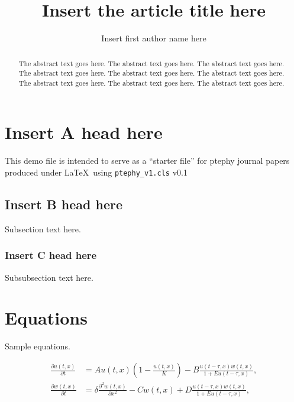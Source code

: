 \documentclass[preprint]{ptephy_v1}%
\begin{document}
\title{Insert the article title here}


\author{Insert first author name here}



\begin{abstract}%
The abstract text goes here. The abstract text goes here. The abstract text goes here.
The abstract text goes here. The abstract text goes here. The abstract text goes here.
The abstract text goes here. The abstract text goes here. The abstract text goes here.
\end{abstract}


\maketitle


\section{Insert A head here}
This demo file is intended to serve as a ``starter file''
for ptephy journal papers produced under \LaTeX\ using
\verb+ptephy_v1.cls+ v0.1

\subsection{Insert B head here}
Subsection text here.

\subsubsection{Insert C head here}
Subsubsection text here.

\section{Equations}

Sample equations.

\begin{equation}\label{1.1}
\begin{split}
\frac{\partial u(t,x)}{\partial t} &= Au(t,x) \left(1-\frac{u(t,x)}{K}\right)-B\frac{u(t-\tau,x) w(t,x)}{1+Eu(t-\tau,x)},\\
\frac{\partial w(t,x)}{\partial t} &=\delta \frac{\partial^2w(t,x)}{\partial x^2}-Cw(t,x)+D\frac{u(t-\tau,x)w(t,x)}{1+Eu(t-\tau,x)},
\end{split}
\end{equation}
\end{document}
